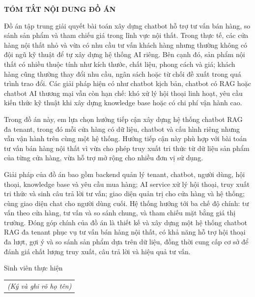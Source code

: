 \documentclass[../DoAn.tex]{subfiles}
\begin{document}
\begin{center}
    \Large{\textbf{TÓM TẮT NỘI DUNG ĐỒ ÁN}}\\
\end{center}
\vspace{1cm}
Đồ án tập trung giải quyết bài toán xây dựng chatbot hỗ trợ tư vấn bán hàng, so sánh sản phẩm và tham chiếu giá trong lĩnh vực nội thất. Trong thực tế, các cửa hàng nội thất nhỏ và vừa có nhu cầu tư vấn khách hàng nhưng thường không có đội ngũ kỹ thuật để tự xây dựng hệ thống AI riêng. Bên cạnh đó, sản phẩm nội thất có nhiều thuộc tính như kích thước, chất liệu, phong cách và giá; khách hàng cũng thường thay đổi nhu cầu, ngân sách hoặc từ chối đề xuất trong quá trình trao đổi. Các giải pháp hiện có như chatbot kịch bản, chatbot có RAG hoặc chatbot AI thương mại vẫn còn hạn chế: khó xử lý hội thoại linh hoạt, yêu cầu kiến thức kỹ thuật khi xây dựng knowledge base hoặc có chi phí vận hành cao.

Trong đồ án này, em lựa chọn hướng tiếp cận xây dựng hệ thống chatbot RAG đa tenant, trong đó mỗi cửa hàng có dữ liệu, chatbot và cấu hình riêng nhưng vẫn vận hành trên cùng một hệ thống. Hướng tiếp cận này phù hợp với bài toán tư vấn bán hàng nội thất vì vừa cho phép truy xuất tri thức từ dữ liệu sản phẩm của từng cửa hàng, vừa hỗ trợ mở rộng cho nhiều đơn vị sử dụng.

Giải pháp của đồ án bao gồm backend quản lý tenant, chatbot, người dùng, hội thoại, knowledge base và yêu cầu mua hàng; AI service xử lý hội thoại, truy xuất tri thức và sinh câu trả lời tư vấn; giao diện quản trị cho cửa hàng và hệ thống; cùng giao diện chat cho người dùng cuối. Hệ thống hướng tới ba chế độ chính: tư vấn theo cửa hàng, tư vấn và so sánh chung, và tham chiếu mặt bằng giá thị trường. Đóng góp chính của đồ án là thiết kế và xây dựng một hệ thống chatbot RAG đa tenant phục vụ tư vấn bán hàng nội thất, có khả năng hỗ trợ hội thoại đa lượt, gợi ý và so sánh sản phẩm dựa trên dữ liệu, đồng thời cung cấp cơ sở để đánh giá chất lượng truy xuất, câu trả lời và hiệu quả tư vấn.
\begin{flushright}
Sinh viên thực hiện\\
\begin{tabular}{@{}c@{}}
\textit{(Ký và ghi rõ họ tên)}
\end{tabular}
\end{flushright}
\end{document}
